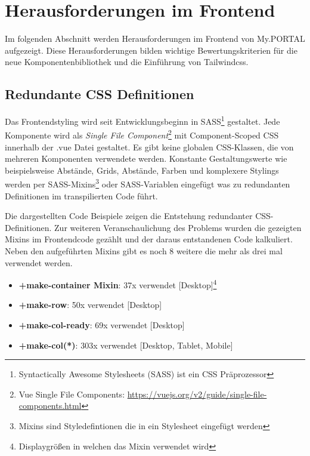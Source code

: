 \chapter{Herausforderungen im Frontend}
\label{cha:Herausforderungen im Frontend}

Im folgenden Abschnitt werden Herausforderungen im Frontend von My.PORTAL aufgezeigt. Diese Herausforderungen bilden wichtige Bewertungskriterien für die neue Komponentenbibliothek und die Einführung von Tailwindcss.

\section{Redundante CSS Definitionen}
\label{sec:redundantCSS}
Das Frontendstyling wird seit Entwicklungsbeginn in SASS\footnote{ Syntactically Awesome Stylesheets (SASS) ist ein CSS Präprozessor } gestaltet. Jede Komponente wird als \textit{Single File Component}\footnote{ Vue Single File Components: \url{https://vuejs.org/v2/guide/single-file-components.html} } mit Component-Scoped CSS innerhalb der .vue Datei gestaltet. Es gibt keine globalen CSS-Klassen, die von mehreren Komponenten verwendete werden. Konstante Gestaltungswerte wie beispielsweise Abstände, Grids, Abstände, Farben und komplexere Stylings werden per SASS-Mixins\footnote{ Mixins sind Styledefintionen die in ein Stylesheet eingefügt werden} oder SASS-Variablen eingefügt was zu redundanten Definitionen im transpilierten Code führt. 







Die dargestellten Code Beispiele zeigen die Entstehung redundanter CSS-Definitionen. Zur weiteren Veranschaulichung des Problems wurden die gezeigten Mixins im Frontendcode gezählt und der daraus entstandenen Code kalkuliert. Neben den aufgeführten Mixins gibt es noch 8 weitere die mehr als drei mal verwendet werden.

\begin{itemize}
  \item \textbf{+make-container Mixin}: 37x verwendet [Desktop]\footnote{ Displaygrößen in welchen das Mixin verwendet wird }
  \item \textbf{+make-row}: 50x verwendet [Desktop]
  \item \textbf{+make-col-ready}: 69x verwendet [Desktop]
  \item \textbf{+make-col(*)}: 303x verwendet [Desktop, Tablet, Mobile]
\end{itemize}

